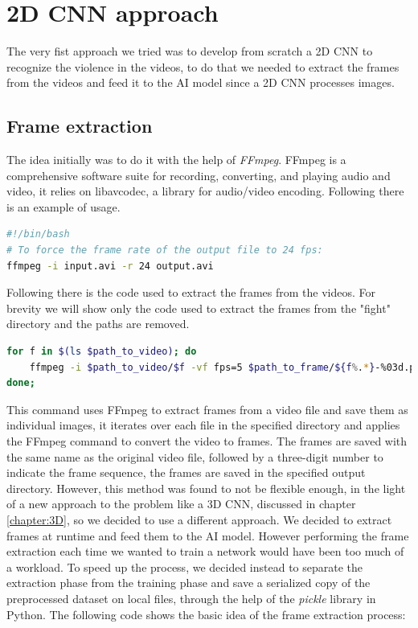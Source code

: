 \chapter{2D CNN approach}
The very fist approach we tried was to develop from scratch a 2D CNN to recognize the violence in the videos, to do that we needed to extract the frames from the videos and feed it to the AI model since a 2D CNN processes images.
\section{Frame extraction}
The idea initially was to do it with the help of \textit{FFmpeg}. FFmpeg is a comprehensive software suite for recording, converting, and playing audio and video, it relies on libavcodec, a library for audio/video encoding. Following there is an example of usage.
\begin{lstlisting}[language=bash, caption={FFmpeg example}, label={lst:FFmpegExample}]
#!/bin/bash
# To force the frame rate of the output file to 24 fps:
ffmpeg -i input.avi -r 24 output.avi

\end{lstlisting}

Following there is the code used to extract the frames from the videos. For brevity we will show only the code used to extract the frames from the "fight" directory and the paths are removed.
\begin{lstlisting}[language=bash, caption={Frame extraction}, label={lst:FrameExtraction}]
for f in $(ls $path_to_video); do 
	ffmpeg -i $path_to_video/$f -vf fps=5 $path_to_frame/${f%.*}-%03d.png; 
done;
\end{lstlisting}

This command uses FFmpeg to extract frames from a video file and save them as individual images, it iterates over each file in the specified directory and applies the FFmpeg command to convert the video to frames. The frames are saved with the same name as the original video file, followed by a three-digit number to indicate the frame sequence, the frames are saved in the specified output directory.
However, this method was found to not be flexible enough, in the light of a new approach to the problem like a 3D CNN, discussed in chapter \ref{chapter:3D}, so we decided to use a different approach. We decided to extract frames at runtime and feed them to the AI model. However performing the frame extraction each time we wanted to train a network would have been too much of a workload. To speed up the process, we decided instead to separate the extraction phase from the training phase and save a serialized copy of the preprocessed dataset on local files, through the help of the \textit{pickle} library in Python. The following code shows the basic idea of the frame extraction process:

